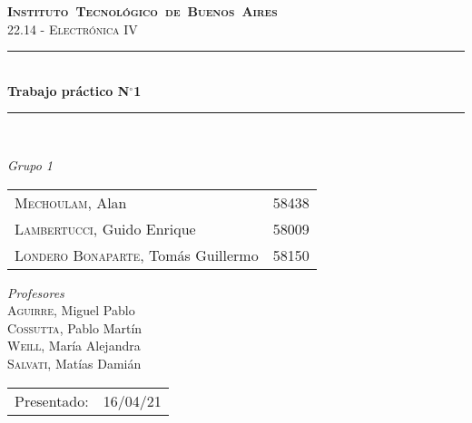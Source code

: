 \begin{titlepage}
\newcommand{\HRule}{\rule{\linewidth}{0.5mm}}
\center
\mbox{\textsc{\LARGE \bfseries {Instituto Tecnológico de Buenos Aires}}}\\[1.5cm]
\textsc{\Large 22.14 - Electrónica IV}\\[0.5cm]


\HRule \\[0.6cm]
{ \Huge \bfseries Trabajo práctico N$^{\circ}$1}\\[0.4cm] 
\HRule \\[1.5cm]


{\large

\emph{Grupo 1}\\
\vspace{3px}

\begin{tabular}{lr} 	
\textsc{Mechoulam}, Alan  &  58438\\
\textsc{Lambertucci}, Guido Enrique  & 58009 \\
\textsc{Londero Bonaparte}, Tomás Guillermo  & 58150 \\
\end{tabular}

\vspace{20px}

\emph{Profesores}\\
\textsc{Aguirre}, Miguel Pablo\\
\textsc{Cossutta}, Pablo Martín\\
\textsc{Weill}, María Alejandra\\
\textsc{Salvati}, Matías Damián\\



\vspace{3px}

\vspace{100px}

\begin{tabular}{ll}

Presentado: & 16/04/21\\

\end{tabular}

}

\vfill

\end{titlepage}

